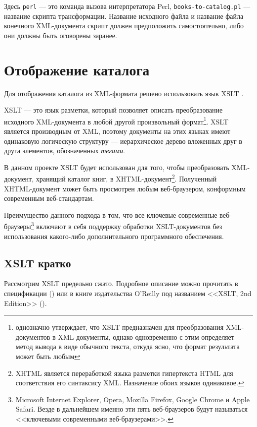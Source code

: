 \documentclass[a4paper,14pt,oneside]{extreport}
\begin{document}
Здесь \verb'perl' --- это команда вызова интерпретатора Perl, \verb'books-to-catalog.pl' --- название скрипта трансформации. Название исходного файла и название файла конечного XML-документа скрипт должен предположить самостоятельно, либо они должны быть оговорены заранее.

\section{Отображение каталога}
Для отображения каталога из XML-формата решено использовать язык XSLT \cite{XSLT-spec}.

XSLT --- это язык разметки, который позволяет описать преобразование исходного XML-документа в любой другой произвольный формат\footnote{\cite{XSLT-spec} однозначно утверждает, что XSLT предназначен для преобразования XML-документов в XML-документы, однако одновременно с этим определяет метод вывода в виде обычного текста, откуда ясно, что формат результата может быть любым}. XSLT является производным от XML, поэтому документы на этих языках имеют одинаковую логическую структуру --- иерархическое дерево вложенных друг в друга элементов, обозначенных \textit{тегами}.

В данном проекте XSLT будет использован для того, чтобы преобразовать XML-документ, хранящий каталог книг, в XHTML-документ\footnote{XHTML \cite{XHTML-spec} является переработкой языка разметки гипертекста HTML \cite{HTML-spec} для соответствия его синтаксису XML. Назначение обоих языков одинаковое.}. Полученный \\ XHTML-документ может быть просмотрен любым веб-браузером, конформным современным веб-стандартам.

Преимущество данного подхода в том, что все ключевые современные веб-браузеры\footnote{Microsoft Internet Explorer, Opera, Mozilla Firefox, Google Chrome и Apple Safari. Везде в дальнейшем именно эти пять веб-браузеров будут называться <<ключевыми современными веб-браузерами>>.} включают в себя поддержку обработки XSLT-документов без использования какого-либо дополнительного программного обеспечения.

\subsection{XSLT кратко}
Рассмотрим XSLT предельно сжато. Подробное описание можно прочитать в спецификации (\cite{XSLT-spec}) или в книге издательства O'Reilly под названием <<XSLT, 2nd Edition>> (\cite{XSLT-o-reilly-book}).
\end{document}
